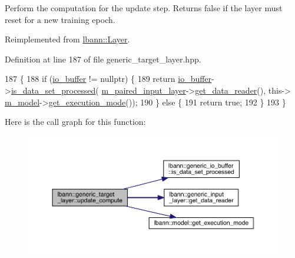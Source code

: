 Perform the computation for the update step. Returns false if the layer must reset for a new training epoch. 

Reimplemented from \hyperlink{classlbann_1_1Layer_a70e08fc96a612f67ade6ba3809536d85}{lbann\+::\+Layer}.



Definition at line 187 of file generic\+\_\+target\+\_\+layer.\+hpp.


\begin{DoxyCode}
187                                  \{
188     \textcolor{keywordflow}{if} (\hyperlink{classlbann_1_1generic__target__layer_a8da650b94f50cc63fc90cd792fa50c3f}{io\_buffer} != \textcolor{keyword}{nullptr}) \{
189       \textcolor{keywordflow}{return} \hyperlink{classlbann_1_1generic__target__layer_a8da650b94f50cc63fc90cd792fa50c3f}{io\_buffer}->\hyperlink{classlbann_1_1generic__io__buffer_a9a038d40aec50dbc24c0abe21ad0c0a9}{is\_data\_set\_processed}(
      \hyperlink{classlbann_1_1generic__target__layer_a84da1260e9feb4fbc3e6f2315e4cab4b}{m\_paired\_input\_layer}->\hyperlink{classlbann_1_1generic__input__layer_a5715a966647e8cc92489f9e1950b2d28}{get\_data\_reader}(), this->
      \hyperlink{classlbann_1_1Layer_a3d9315e99574166f2f33e37b572021d2}{m\_model}->\hyperlink{classlbann_1_1model_addb40597cf29aa6d31b6a7d09ef48608}{get\_execution\_mode}());
190     \} \textcolor{keywordflow}{else} \{
191       \textcolor{keywordflow}{return} \textcolor{keyword}{true};
192     \}
193   \}
\end{DoxyCode}
Here is the call graph for this function\+:\nopagebreak
\begin{figure}[H]
\begin{center}
\leavevmode
\includegraphics[width=350pt]{classlbann_1_1generic__target__layer_a43f4de7c1846b605aa9bb6daf9338c78_cgraph}
\end{center}
\end{figure}
\mbox{\label{classlbann_1_1generic__target__layer_a0dbe5fc5203e15ddcf8348daf2f697c5}} 
